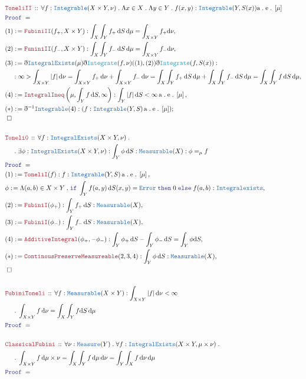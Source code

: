 \documentclass[12pt]{scrartcl}
\newcommand{\TYPE}[1]{\textcolor{NavyBlue}{\mathtt{#1}}}
\newcommand{\FUNC}[1]{\textcolor{Cerulean}{\mathtt{#1}}}
\newcommand{\LOGIC}[1]{\textcolor{Blue}{\mathtt{#1}}}
\newcommand{\THM}[1]{\textcolor{Maroon}{\mathtt{#1}}}
\renewcommand{\.}{\; . \;}
\newcommand{\de}{: \kern 0.1pc =}
\newcommand{\If}{\LOGIC{if} \;}
\newcommand{\Then}{ \; \LOGIC{then} \;}
\newcommand{\Else}{\; \LOGIC{else} \;}
\newcommand{\Theorem}[2]{& \THM{#1} \, :: \, #2 \\ & \Proof = \\ }
\newcommand{\NewLine}{\\ & \kern 1pc}
\newcommand{\ForEach}[3]{\forall #1 : #2 \. #3 }
\newcommand{\Say}[3]{& #1 \de #2 : #3, \\}
\newcommand{\Conclude}[3]{& #1 \de #2 : #3; \\}
\newcommand{\QED}{\; \square}
\newcommand{\EndProof}{& \QED \\}
\newcommand{\ByDef}{\eth}
\newcommand{\Proof}{\LOGIC{Proof} \; }
\renewcommand{\AE}[1]{\mathrm{a\. e\.} \left[#1\right]}
\begin{document}
\newpage
\begin{align*}
\Theorem{ToneliII}{
\ForEach{f}{\TYPE{Integrable}(X \times Y, \nu)}{
 \Lambda x \in X \.  \Lambda y \in Y \. f(x,y) : \TYPE{Integrable}(Y,S(x)) \AE{\mu}
}}
\Say{(1)}{ \THM{FubiniII}(f_+,X \times Y) }
{ \int_X \int_Y f_+ \, \mathrm{d} S \, \mathrm{d}\mu 
 = \int_{X \times Y} f_+ \mathrm{d}{\nu}  
 }
\Say{(2)}{ \THM{FuniniII}(f_-,X \times Y)}
{
 \int_X \int_Y f_- \, \mathrm{d} S \, \mathrm{d} \mu
 = \int_{X \times Y} f_- \mathrm{d}{\nu}
}
\Say{(3)}{ \ByDef\TYPE{IntegralExists}(\mu)\ByDef\FUNC{Integrate}(f,\nu)((1),(2))\ByDef\FUNC{Integrate}(f,S(x))  : \NewLine }
{ \infty >  \int_{X \times Y} |f|  \,\mathrm{d} \nu  
 = \int_{X \times Y} f_+ \, \mathrm{d} \nu
  + \int_{X \times Y} f_- \, \mathrm{d} \nu =
 \int_X \int_Y f_+ \, \mathrm{d} S \, \mathrm{d} \mu
 + \int_X \int_Y f_- \, \mathrm{d} S \, \mathrm{d} \mu =
\int_X \int_Y f \, \mathrm{d} S \, \mathrm{d} \mu
}
\Say{(4)}{\THM{IntegralIneq}\left( \mu  , \int_Y f \, \mathrm{d} S, \infty \right)}
{ \int_Y |f| \,  \mathrm{d}  S  < \infty  \, \AE{\mu} }
\Conclude{(*)}{\ByDef^{-1} \TYPE{Integrable}(4)}{ ( f : \TYPE{Integrable}(Y,S) \, \AE{\mu} ) }
\EndProof
\\
\Theorem{Toneli0}{
\ForEach{f}{\TYPE{IntegralExists}(X \times Y, \nu)  \. \NewLine }
{ \exists \phi : \TYPE{IntegralExists}(X \times Y, \nu) :  \int_Y \phi  \, \mathrm{d}S : \TYPE{Measurable}(X) : \phi =_\mu  f
}}
\Say{(1)}{ \THM{ToneliI}(f)}{ f : \TYPE{Integrable}(Y,S) \, \AE{\mu} }
\Say{\phi}{ \Lambda (a,b) \in X \times Y \. \If \int_Y f(a,y) \, \mathrm{d}S(x,y) = \TYPE{Error} \Then 0 \Else f(a,b)  }
{ \TYPE{Integralexists}}
\Say{(2)}{\THM{FubiniI}(\phi_+)}{ \int_Y f_+ \, \mathrm{d}S : \TYPE{Measurable}(X) }
\Say{(3)}{ \THM{FubiniI}(\phi_-)}{ \int_Y f_- \, \mathrm{d}S : \TYPE{Measurable}(X)}
\Say{(4)}{ \THM{AdditiveIntegral}(\phi_+, -\phi_-) }{ \int_Y \phi_+ \, \mathrm{d}S - \int_Y \phi_- \, \mathrm{d}S =   \int_Y \phi \mathrm{d}S }
\Say{(*)}{\THM{ContinousPreserveMeasureable}(2,3,4)}{ \int_Y \phi \, \mathrm{d}S : \TYPE{Measurable}(X)}
\EndProof
\\
\Theorem{FubiniToneli}{
\ForEach{f}{\TYPE{Measurable}(X \times Y)  : \int_{X \times Y} |f| \, \mathrm{d}\nu < \infty \NewLine }
{ \int_{X \times Y} f \, \mathrm{d} \nu = \int_X \int_Y f \mathrm{d}S \,  \mathrm{d}\mu  }}
\\
\Theorem{ClassicalFubini}{
 \ForEach{\nu}{\TYPE{Measure}(Y)}{
 \ForEach{ f }{\TYPE{IntegralExists}(X \times Y, \mu \times \nu) \. \NewLine}{
  \int_{X \times Y} f \, \mathrm{d}\mu \times \nu =
   \int_X \int_Y f \, \mathrm{d}\mu \, \mathrm{d} \nu =
   \int_Y \int_X f \, \mathrm{d}\nu  \,\mathrm{d} \mu
}}} 
\end{align*}
\newpage
\end{document}
